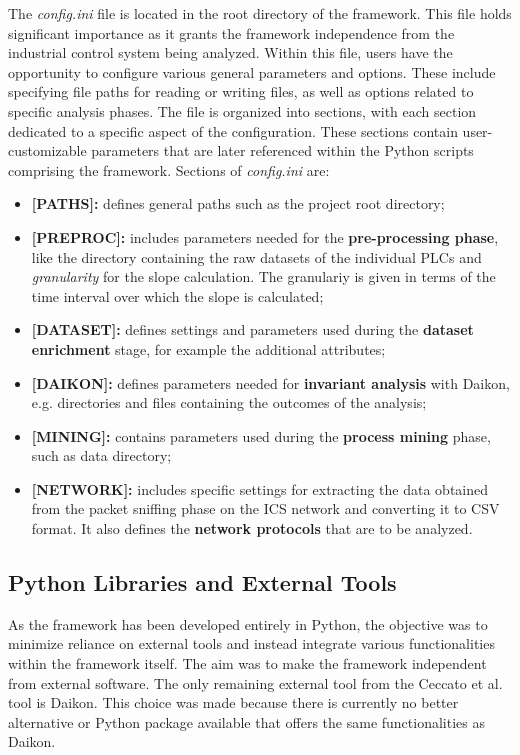 The \textit{config.ini} file is located in the root directory of the framework. This file holds significant importance as it grants the framework independence from the industrial control system being analyzed. Within this file, users have the opportunity to configure various general parameters and options. These include specifying file paths for reading or writing files, as well as options related to specific analysis phases.\newline
The file is organized into sections, with each section dedicated to a specific aspect of the configuration. These sections contain user-customizable parameters that are later referenced within the Python scripts comprising the framework. Sections of \textit{config.ini} are:

\begin{itemize}
	\item \textbf{[PATHS]:} defines general paths such as the project root directory;
	
	\item \textbf{[PREPROC]:} includes parameters needed for the \textbf{pre-processing phase}, like the directory containing the raw datasets of the individual PLCs and \textit{granularity} for the slope calculation. The granulariy is given in terms of the time interval over which the slope is calculated;
	
	\item \textbf{[DATASET]:} defines settings and parameters used during the \textbf{dataset enrichment} stage, for example the additional attributes;
	
	\item \textbf{[DAIKON]:} defines parameters needed for \textbf{invariant analysis} with Daikon, e.g. directories and files containing the outcomes of the analysis;
	
	\item \textbf{[MINING]:} contains parameters used during the \textbf{process mining} phase, such as data directory;
	
	\item \textbf{[NETWORK]:} includes specific settings for extracting the data obtained from the packet sniffing phase on the ICS network and converting it to CSV format. It also defines the \textbf{network protocols} that are to be analyzed.
\end{itemize}

\subsection{Python Libraries and External Tools}
\label{subsec:4_tools_libraries}
As the framework has been developed entirely in Python, the objective was to minimize reliance on external tools and instead integrate various functionalities within the framework itself. The aim was to make the framework independent from external software. The only remaining external tool from the Ceccato et al. tool is Daikon. This choice was made because there is currently no better alternative or Python package available that offers the same functionalities as Daikon.

